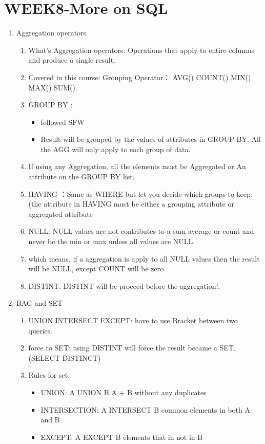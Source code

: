 \pagebreak
\section{WEEK8-More on SQL}
 
\begin{enumerate}
    \item Aggregation operators\begin{enumerate}
        
    \item What's Aggregation operators: Operations that apply to entire columns and produce a single result.
    \item Covered in this course: Grouping Operator： AVG() COUNT() MIN() MAX() SUM().
    \item GROUP BY : \begin{itemize}
        \item followed SFW
        \item Result will be grouped by the values of attributes in GROUP BY. All the AGG will only apply to each group of data.
    \end{itemize}
    \item If using any Aggregation, all the elements must be Aggregated or An attribute on the GROUP BY list.
    \item HAVING ：Same as WHERE but let you decide which groups to keep. (the attribute in HAVING must be either a grouping attribute or aggregated attribute
    \item NULL: NULL values are not contributes to a sum average or count and never be the min or max unless all values are NULL.
    \item which means, if a aggregation is apply to all NULL values then the result will be NULL, except COUNT will be zero.
    \item DISTINT: DISTINT will be proceed before the aggregation!.
    \end{enumerate}
    \item BAG and SET \begin{enumerate}
    \item UNION INTERSECT EXCEPT: have to use Bracket between two queries.
    \item force to SET: using DISTINT will force the result became a SET.(SELECT DISTINCT)
    \item  Rules for set:
    \begin{itemize}
        \item UNION: A UNION B A + B without any duplicates
        \item INTERSECTION: A INTERSECT B common elements in both A and B
        \item EXCEPT: A EXCEPT B elements that in  not in B
    \end{itemize}
    

\end{enumerate}
\end{enumerate}
